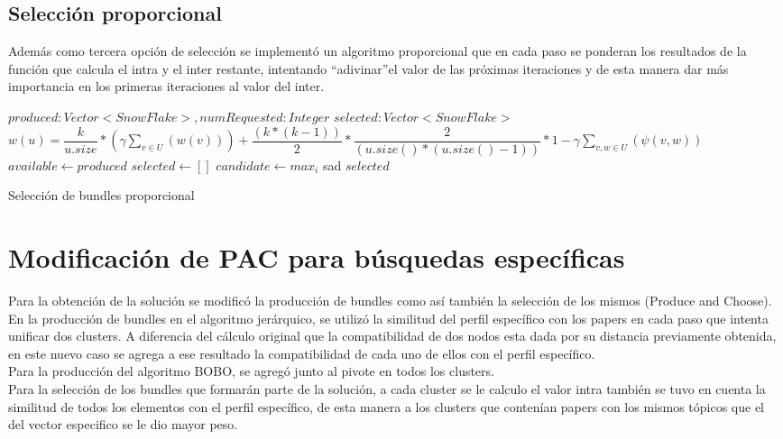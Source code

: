 \subsection{Selección proporcional}
Además como tercera opción de selección se implementó un algoritmo proporcional que en cada paso se 
ponderan los resultados de la función que calcula el intra y el inter restante, intentando 
\textquotedblleft adivinar\textquotedblright  el valor de las próximas iteraciones y de esta manera 
dar más importancia en los primeras iteraciones al valor del inter.
\begin{algorithm}[H]
\begin{algorithmic}[1]
\REQUIRE $produced:Vector<SnowFlake>, numRequested:Integer$
\ENSURE $selected:Vector<SnowFlake>$
\STATE $w(u) = \dfrac{k}{u.size} * (\gamma \sum_{v \in U}(w(v))) + \dfrac{(k * (k-1))}{2} * \dfrac{2}{(u.size() * (u.size() - 1))} * 1 - \gamma \sum_{v,w \in U}(\psi(v,w))$
\STATE $available \leftarrow produced$
\STATE $selected \leftarrow []$
\STATE $candidate \leftarrow max_{i}$
\ENDWHILE sad
\RETURN $selected$
\end{algorithmic}
\caption{Selección de bundles proporcional}\label{alg:algSelProp}
\end{algorithm}

\section{Modificación de PAC para búsquedas específicas}
Para la obtención de la solución se modificó la producción de bundles como así también la 
selección de los mismos (Produce and Choose). \\
En la producción de bundles en el algoritmo jerárquico, se utilizó la similitud del perfil 
específico con los papers en cada paso que intenta unificar dos clusters. A diferencia del cálculo 
original que la compatibilidad de dos nodos esta dada por su distancia previamente obtenida, en 
este nuevo caso se agrega a ese resultado la compatibilidad de cada uno de ellos con el perfil 
específico. \\
Para la producción del algoritmo BOBO, se agregó junto al pivote en todos los clusters. \\
Para la selección de los bundles que formarán parte de la solución, a cada cluster se le 
calculo el valor intra también se tuvo en cuenta la similitud de todos los elementos con el perfil  
específico, de esta manera a los clusters que contenían papers con los mismos tópicos que el del 
vector especifico se le dio mayor peso.

